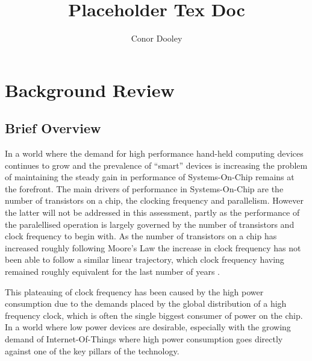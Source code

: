 \documentclass[11pt,english,british]{report}
\begin{document}
\title{Placeholder Tex Doc}
\author{Conor Dooley}
\maketitle
\doublespacing
\chapter{Background Review}
\section{Brief Overview}
In a world where the demand for high performance hand-held computing devices continues to grow and the prevalence of ``smart'' devices is increasing the problem of maintaining the steady gain in performance of Systems-On-Chip remains at the forefront. %
The main drivers of performance in Systems-On-Chip are the number of transistors on a chip, the clocking frequency and parallelism. However the latter will not be addressed in this assessment, partly as the performance of the paralellised operation is largely governed by the number of transistors and clock frequency to begin with. %
As the number of transistors on a chip has increased roughly following Moore's Law the increase in clock frequency has not been able to follow a similar linear trajectory, which clock frequency having remained roughly equivalent for the last number of years \cite{ross2008cpu}.

This plateauing of clock frequency has been caused by the high power consumption due to the demands placed by the global distribution of a high frequency clock, which is often the single biggest consumer of power on the chip. %
In a world where low power devices are desirable, especially with the growing demand of Internet-Of-Things where high power consumption goes directly against one of the key pillars of the technology. %
\end{document}

